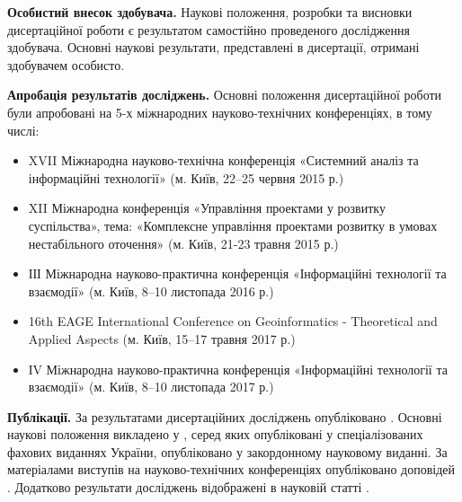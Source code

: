 \textbf{Особистий внесок здобувача.} Наукові положення, розробки та висновки дисертаційної роботи є результатом самостійно проведеного дослідження здобувача. Основні наукові результати, представлені в дисертації, отримані здобувачем особисто.

\textbf{Апробація результатів досліджень.} Основні положення дисертаційної роботи були апробовані на 5-х міжнародних науково-технічних конференціях, в тому числі:

\begin{itemize}
	\item XVII Міжнародна науково-технічна конференція «Системний аналіз та інформаційні технології» (м. Київ, 22--25 червня 2015 р.)
	\item XII Міжнародна конференція «Управління проектами у розвитку суспільства», тема: «Комплексне управління проектами розвитку в умовах нестабільного оточення» (м. Київ, 21-23 травня 2015 р.)
	\item ІІІ Міжнародна науково-практична конференція «Інформаційні технології та взаємодії» (м. Київ, 8--10 листопада 2016 р.)
	\item 16th EAGE International Conference on Geoinformatics - Theoretical and Applied Aspects (м. Київ, 15--17 травня 2017 р.)
	\item ІV Міжнародна науково-практична конференція «Інформаційні технології та взаємодії» (м. Київ, 8--10 листопада 2017 р.)
\end{itemize}

\printbibliography[heading=countauthor, env=countauthor, keyword=biblioauthor, section=1]
\printbibliography[heading=countauthorvak, env=countauthorvak, keyword=biblioauthorvak, section=1]
\printbibliography[heading=countauthorconf, env=countauthorconf, keyword=biblioauthorconf, section=1]

\textbf{Публікації.} 
За результатами дисертаційних досліджень опубліковано
. 
Основні наукові положення викладено у 
 \cite{art2,art3,art4,art5,art8},
серед яких \cite{art2,art3,art4,art5} опубліковані у спеціалізованих фахових виданнях України, 
\cite{art8} опубліковано у закордонному науковому виданні. 
За матеріалами виступів на науково-технічних конференціях опубліковано 
 доповідей \cite{conf5,conf6,conf8,conf9,conf10}.
Додатково результати досліджень відображені в науковій статті \cite{art1}.

\printbibliography[heading=countauthor, env=countauthor, keyword=biblioauthor]

